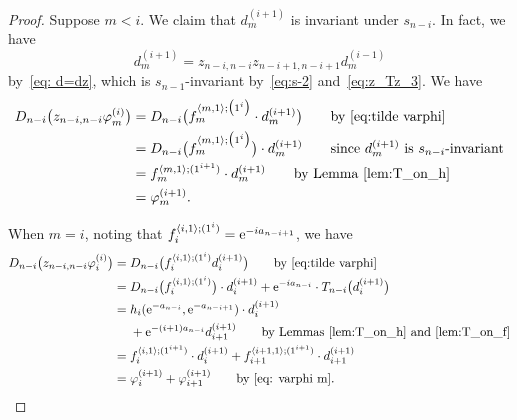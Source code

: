 \documentclass[pdftex]{sigma}
\numberwithin{equation}{section}
\newcommand{\ha}{f}
\theoremstyle{definition}
\begin{document}
\begin{proof}

Suppose $m<i$. We claim that $d^{(i+1)}_m$ is invariant under $s_{n-i}$.
In fact, we have
\begin{equation*}
 d^{(i+1)}_m=z_{n-i,n-i}z_{n-i+1,n-i+1}d^{(i-1)}_m
\end{equation*} by~\eqref{eq: d=dz},
which is $s_{n-1}$-invariant
by~\eqref{eq:s-2} and~\eqref{eq:z_Tz_3}.
We have
\begin{align*}
D_{n-i}\bigl({z_{n-i,n-i}{\varphi}}^{(i)}_m\bigr)&=
D_{n-i}\bigl(\ha_{m}^{\langle m,1\rangle; \bigl(1^i\bigr)}\cdot d^{(i+1)}_m\bigr)\qquad\text{by $\eqref{eq:tilde varphi}$}\\
&=D_{n-i}\bigl(\ha_{m}^{\langle m,1\rangle; \bigl(1^i\bigr)}\bigr)\cdot d^{(i+1)}_m\qquad\text{since $d^{(i+1)}_m$ is $s_{n-i}$-invariant}
\\&=
\ha_{m}^{\langle m,1\rangle; (1^{i+1})}\cdot d^{(i+1)}_m
\qquad\text{by Lemma~\ref{lem:T_on_h} }
\\&=\varphi^{(i+1)}_m.
\end{align*}

When $m=i$, noting that
$\ha_i^{\langle i,1\rangle; (1^{i})}
={\rm e}^{-ia_{n-i+1}}$,
we have
\begin{align*}
D_{n-i}\bigl({z_{n-i,n-i}{\varphi}}^{(i)}_i\bigr)
={}&
D_{n-i}\bigl(
\ha_i^{\langle i,1\rangle; (1^{i})}
d^{(i+1)}_i\bigr)\qquad\text{by~\eqref{eq:tilde varphi}}\\
={}&
D_{n-i}\bigl(\ha_i^{\langle i,1\rangle; (1^{i})}\bigr)\cdot d^{(i+1)}_i
+{\rm e}^{-ia_{n-i}}\cdot T_{n-i}\bigl(d^{(i+1)}_i\bigr)\\
={}&
h_i({\rm e}^{-a_{n-i}},{\rm e}^{-a_{n-i+1}})\cdot d_{i}^{(i+1)}\\
&+{\rm e}^{-(i+1)a_{n-i}}d^{(i+1)}_{i+1}
\qquad\text{by Lemmas~\ref{lem:T_on_h} and~\ref{lem:T_on_f}}\\
={}&\ha_i^{\langle i,1\rangle; (1^{i+1})}\cdot d_{i}^{(i+1)}+
\ha_{i+1}^{\langle i+1,1\rangle;(1^{i+1})}\cdot d^{(i+1)}_{i+1}
\\
={}&\varphi^{(i+1)}_i+\varphi^{(i+1)}_{i+1} \qquad\text{by~\eqref{eq: varphi m}}.\tag*{\qed}
\end{align*} \renewcommand{\qed}{}
\end{proof}
\end{document}
